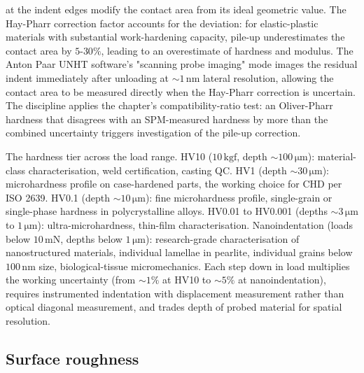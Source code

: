  at the indent edges modify the
contact area from its ideal geometric value. The Hay-Pharr
correction factor accounts for the deviation: for elastic-plastic
materials with substantial work-hardening capacity, pile-up
underestimates the contact area by $5$-$30\%$, leading to an
overestimate of hardness and modulus. The Anton Paar UNHT
software's "scanning probe imaging" mode images the residual
indent immediately after unloading at $\sim 1\,\si{\nano\meter}$
lateral resolution, allowing the contact area to be measured
directly when the Hay-Pharr correction is uncertain. The
discipline applies the chapter's compatibility-ratio test: an
Oliver-Pharr hardness that disagrees with an SPM-measured
hardness by more than the combined uncertainty triggers
investigation of the pile-up correction.

The hardness tier across the load range. HV10 ($10\,\text{kgf}$,
depth $\sim 100\,\si{\micro\meter}$): material-class
characterisation, weld certification, casting QC. HV1 (depth
$\sim 30\,\si{\micro\meter}$): microhardness profile on
case-hardened parts, the working choice for CHD per ISO 2639.
HV0.1 (depth $\sim 10\,\si{\micro\meter}$): fine microhardness
profile, single-grain or single-phase hardness in polycrystalline
alloys. HV0.01 to HV0.001 (depths $\sim 3\,\si{\micro\meter}$ to
$1\,\si{\micro\meter}$): ultra-microhardness, thin-film
characterisation. Nanoindentation (loads below $10\,\si{\milli
\newton}$, depths below $1\,\si{\micro\meter}$): research-grade
characterisation of nanostructured materials, individual lamellae
in pearlite, individual grains below $100\,\si{\nano\meter}$
size, biological-tissue micromechanics. Each step down in load
multiplies the working uncertainty (from $\sim 1\%$ at HV10 to
$\sim 5\%$ at nanoindentation), requires instrumented
indentation with displacement measurement rather than optical
diagonal measurement, and trades depth of probed material for
spatial resolution.

\subsection{Surface roughness}

